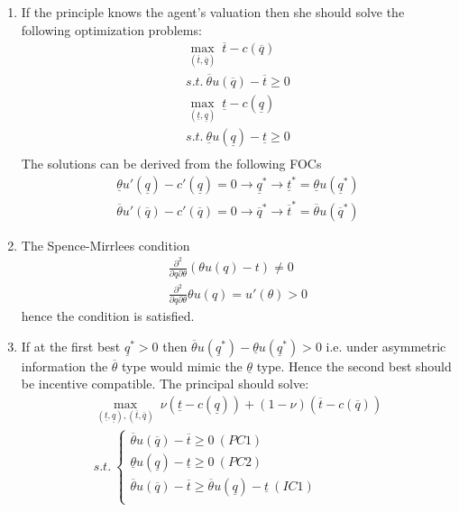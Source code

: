 \documentclass[a4paper]{article}
\newcommand{\ubar}{\overline}
\newcommand{\lbar}{\underline}
\begin{document}
\begin{enumerate}
	\item If the principle knows the agent's valuation then she should solve the following optimization problems:
	\begin{align*}
	\underset{(\overline{t}, \overline{q})}{\max}\ \overline{t} - c(\overline{q})\\
	s.t.\ \overline{\theta} u(\overline{q}) - \overline{t} \ge 0\\
	\underset{(\underline{t}, \underline{q})}{\max}\ \underline{t} - c(\underline{q})\\
	s.t.\ \underline{\theta} u(\underline{q}) - \underline{t} \ge 0\\
	\end{align*}
	The solutions can be derived from the following FOCs
	\begin{align*}
	\underline{\theta} u'(\underline{q}) - c'(\underline{q}) = 0 \to \underline{q}^* \to \underline{t}^* = \underline{\theta}u(\underline{q}^*)\\
	\overline{\theta} u'(\overline{q}) - c'(\overline{q}) = 0 \to \overline{q}^* \to \overline{t}^* = \overline{\theta}u(\overline{q}^*)
	\end{align*}
	\item The Spence-Mirrlees condition
	\begin{align*}
	\frac{\partial ^2}{\partial q \partial \theta} (\theta u(q) - t) \neq 0\\
	\frac{\partial ^2}{\partial q \partial \theta} \theta u(q) = u'(\theta) > 0
	\end{align*}
	hence the condition is satisfied.
	\item If at the first best $\underline{q}^* > 0$ then $\overline{\theta} u(\underline{q}^*) - \underline{\theta}u(\underline{q}^*) > 0$ i.e. under asymmetric information the $\ubar{\theta}$ type would mimic the $\lbar{\theta}$ type. Hence the second best should be incentive compatible. The principal should solve:
	\begin{align*}
	\underset{(\underline{t}, \underline{q}), (\overline{t}, \overline{q})}{\max}\ \nu(\underline{t} - c(\underline{q})) + (1 - \nu)(\overline{t} - c(\overline{q}))\\
	s.t.\ \begin{cases}
	\overline{\theta} u(\overline{q}) - \overline{t} \ge 0\ (PC1)\\
	\underline{\theta} u(\underline{q}) - \underline{t} \ge 0\ (PC2)\\
	\overline{\theta} u(\overline{q}) - \overline{t} \ge \overline{\theta} u(\underline{q}) - \underline{t}\ (IC1)\\

\end{cases}
\end{align*}
\end{enumerate}
\end{document}
